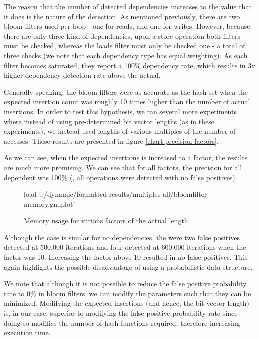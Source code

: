 The reason that the number of detected dependencies increases to the value that it does is the nature of the detection. As mentioned previously, there are two bloom filters used per loop - one for reads, and one for writes. However, because there are only three kind of dependencies, upon a store operation both filters must be checked, whereas the loads filter must only be checked one - a total of three checks (we note that each dependency type has equal weighting). As each filter becomes saturated, they report a 100\% dependency rate, which results in 3x higher dependency detection rate above the actual.

Generally speaking, the bloom filters were as accurate as the hash set when the expected insertion count was roughly 10 times higher than the number of actual insertions. In order to test this hypothesis, we ran several more experiments where instead of using pre-determined bit vector lengths (as in these experiments), we instead used lengths of various multiples of the number of accesses. These results are presented in figure \ref{chart:precision-factors}.

As we can see, when the expected insertions is increased to a factor, the results are much more promising. We can see that for all factors, the precision for all dependent was 100\% (\ie, all operations were detected with no false positives).

\begin{figure}
	\centering
	\begin{gnuplot}[terminal=pdf]
		load '../dynamic/formatted-results/multiples-all/bloomfilter-memory.gnuplot'
	\end{gnuplot}
	\caption{Memory usage for various factors of the actual length}
	\label{chart:mem-factors}
\end{figure}

Although the case is similar for no dependencies, the were two false positives detected at 500,000 iterations and four detected at 600,000 iterations when the factor was 10. Increasing the factor above 10 resulted in no false positives. This again highlights the possible disadvantage of using a probabilistic data structure.

We note that although it is not possible to reduce the false positive probability rate to 0\% in bloom filters, we can modify the parameters such that they can be minimized. Modifying the expected insertions (and hence, the bit vector length) is, in our case, superior to modifying the false positive probability rate since doing so modifies the number of hash functions required, therefore increasing execution time.

